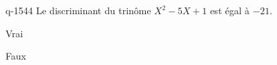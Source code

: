 \begin{truefalse}{q-1544}
Le discriminant du trinôme $X^2-5X+1$ est égal à $-21$.
\item Vrai
\item* Faux
\end{truefalse}

